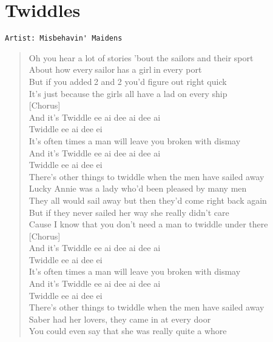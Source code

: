 \documentclass[11pt]{article}
\begin{document}
\section{Twiddles}
\label{sec:org165e89a}
\begin{verbatim}
Artist: Misbehavin' Maidens
\end{verbatim}
\begin{verse}
Oh you hear a lot of stories 'bout the sailors and their sport\\
About how every sailor has a girl in every port\\
But if you added 2 and 2 you’d figure out right quick\\
It's just because the girls all have a lad on every ship\\
\vspace*{1em}
[Chorus]\\
And it's Twiddle ee ai dee ai dee ai\\
Twiddle ee ai dee ei\\
It’s often times a man will leave you broken with dismay\\
And it's Twiddle ee ai dee ai dee ai\\
Twiddle ee ai dee ei\\
There's other things to twiddle when the men have sailed away\\
Lucky Annie was a lady who'd been pleased by many men\\
They all would sail away but then they'd come right back again\\
But if they never sailed her way she really didn't care\\
Cause I know that you don't need a man to twiddle under there\\
\vspace*{1em}
[Chorus]\\
And it's Twiddle ee ai dee ai dee ai\\
Twiddle ee ai dee ei\\
It’s often times a man will leave you broken with dismay\\
And it’s Twiddle ee ai dee ai dee ai\\
Twiddle ee ai dee ei\\
There's other things to twiddle when the men have sailed away\\
\vspace*{1em}
Saber had her lovers, they came in at every door\\
You could even say that she was really quite a whore\\

\end{verse}
\end{document}
